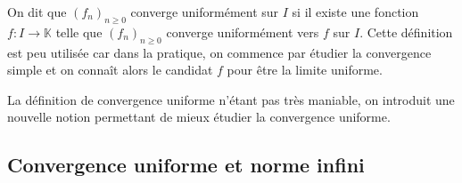 \documentclass[french,11pt,twoside]{VcCours}
\begin{document}
\begin{Remarque}{} On dit que $(f_n)_{n \geq 0}$ converge uniformément sur $I$ si il existe une fonction $f : I \rightarrow \mathbb{K}$ telle que $(f_n)_{n \geq 0}$ converge uniformément vers $f$ sur $I$. Cette définition est peu utilisée car dans la pratique, on commence par étudier la convergence simple et on connaît alors le candidat $f$ pour être la limite uniforme.
\end{Remarque}

\medskip

La définition de convergence uniforme n'étant pas très maniable, on introduit une nouvelle notion permettant de mieux étudier la convergence uniforme.

\subsection{Convergence uniforme et norme infini}
%
%
%
\end{document}
